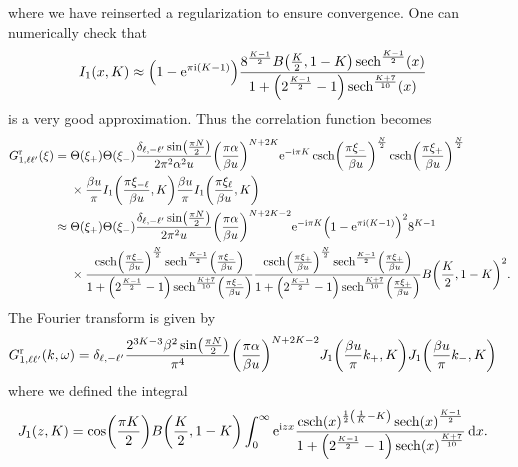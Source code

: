 \documentclass[english, parskip=full]{scrartcl}
\begin{document}
where we have reinserted a regularization to ensure convergence.
One can numerically check that
\begin{align}
I_1(x,K) &\approx \kla*{1 - \powe{\pi\i (K-1)}} \frac{8^\frac{K-1}{2} B\kla*{\frac{K}{2}, 1-K} \sech^\frac{K-1}{2}(x)}{1 + \kla*{2^\frac{K-1}{2} - 1} \sech^\frac{K+7}{10}(x)}
\end{align}
is a very good approximation.
Thus the correlation function becomes
\begin{align}
G_{1,\ell\ell'}^\r(\xi) &= \bsplit{&\Theta(\xi_+)\Theta(\xi_-) \frac{\delta_{\ell,-\ell'}\sin\kla*{\frac{\pi N}{2}}}{2\pi^2\alpha^2 u} \kla*{\frac{\pi\alpha}{\beta u}}^{N+2K} \powe{-\i\pi K} \csch\kla*{\frac{\pi \xi_-}{\beta u}}^\frac{N}{2} \csch\kla*{\frac{\pi \xi_+}{\beta u}}^\frac{N}{2}\\
&\times \frac{\beta u}{\pi} I_1\kla*{\frac{\pi\xi_{-\ell}}{\beta u}, K} \frac{\beta u}{\pi} I_1\kla*{\frac{\pi\xi_\ell}{\beta u}, K} }\\
&\approx \bsplit{&\Theta(\xi_+)\Theta(\xi_-) \frac{\delta_{\ell,-\ell'} \sin\kla*{\frac{\pi N}{2}}}{2\pi^2 u} \kla*{\frac{\pi\alpha}{\beta u}}^{N+2K-2} \powe{-\i\pi K} \kla*{1 - \powe{\pi\i (K-1)}}^2 8^{K-1} \\
&\times \frac{\csch\kla*{\frac{\pi \xi_-}{\beta u}}^\frac{N}{2} \sech^\frac{K-1}{2}\kla*{\frac{\pi\xi_{-}}{\beta u}}}{1 + \kla*{2^\frac{K-1}{2} - 1} \sech^\frac{K+7}{10}\kla*{\frac{\pi\xi_{-}}{\beta u}}} \frac{\csch\kla*{\frac{\pi \xi_+}{\beta u}}^\frac{N}{2} \sech^\frac{K-1}{2}\kla*{\frac{\pi\xi_{+}}{\beta u}}}{1 + \kla*{2^\frac{K-1}{2} - 1} \sech^\frac{K+7}{10}\kla*{\frac{\pi\xi_{+}}{\beta u}}} B\kla*{\frac{K}{2}, 1-K}^2. }
\end{align}
The Fourier transform is given by
\begin{align}
G_{1,\ell\ell'}^\r(k,\omega) &= \delta_{\ell,-\ell'} \frac{2^{3K-3} \beta^2\sin\kla*{\frac{\pi N}{2}}}{\pi^4} \kla*{\frac{\pi\alpha}{\beta u}}^{N+2K-2} J_1\kla*{\frac{\beta u}{\pi}k_+, K} J_1\kla*{\frac{\beta u}{\pi}k_-, K}
\end{align}
where we defined the integral
\begin{align}
J_1(z,K) &= \cos\kla*{\frac{\pi K}{2}} B\kla*{\frac{K}{2}, 1-K} \intx{0}{\infty}{\powe{\i zx} \frac{\csch(x)^{\frac{1}{2} \kla*{\frac{1}{K} - K}} \sech(x)^\frac{K-1}{2}}{1 + \kla*{2^\frac{K-1}{2} - 1} \sech(x)^\frac{K+7}{10}} }{x}.
\end{align}


\end{document}
